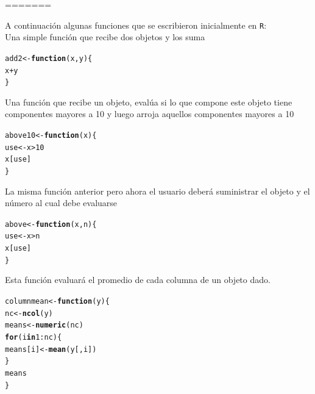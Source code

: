 \documentclass{article}\usepackage[]{graphicx}\usepackage[]{color}
\makeatletter
\newcommand{\hlnum}[1]{\textcolor[rgb]{0.686,0.059,0.569}{#1}}%
\newcommand{\hlopt}[1]{\textcolor[rgb]{0,0,0}{#1}}%
\newcommand{\hlstd}[1]{\textcolor[rgb]{0.345,0.345,0.345}{#1}}%
\newcommand{\hlkwa}[1]{\textcolor[rgb]{0.161,0.373,0.58}{\textbf{#1}}}%
\newcommand{\hlkwb}[1]{\textcolor[rgb]{0.69,0.353,0.396}{#1}}%
\newcommand{\hlkwc}[1]{\textcolor[rgb]{0.333,0.667,0.333}{#1}}%
\newcommand{\hlkwd}[1]{\textcolor[rgb]{0.737,0.353,0.396}{\textbf{#1}}}%
\newenvironment{kframe}{%
 \def\at@end@of@kframe{}%
 \ifinner\ifhmode%
  \def\at@end@of@kframe{\end{minipage}}%
  \begin{minipage}{\columnwidth}%
 \fi\fi%
 \def\FrameCommand##1{\hskip\@totalleftmargin \hskip-\fboxsep
 \colorbox{shadecolor}{##1}\hskip-\fboxsep
     \hskip-\linewidth \hskip-\@totalleftmargin \hskip\columnwidth}%
 \MakeFramed {\advance\hsize-\width
   \@totalleftmargin\z@ \linewidth\hsize
   \@setminipage}}%
 {\par\unskip\endMakeFramed%
 \at@end@of@kframe}
\newenvironment{knitrout}{}{} %
\makeatother
\begin{document}
=======

A continuación algunas funciones que se escribieron inicialmente en \texttt{R}:\\

Una simple función que recibe dos objetos y los suma
\begin{knitrout}
\color{fgcolor}\begin{kframe}
\begin{alltt}
\hlstd{add2} \hlkwb{<-} \hlkwa{function}\hlstd{(}\hlkwc{x}\hlstd{,} \hlkwc{y}\hlstd{) \{}
    \hlstd{x} \hlopt{+} \hlstd{y}
\hlstd{\}}
\end{alltt}
\end{kframe}
\end{knitrout}

Una función que recibe un objeto, evalúa si lo que compone este objeto tiene componentes mayores a 10 y luego arroja aquellos componentes mayores a 10   
\begin{knitrout}
\color{fgcolor}\begin{kframe}
\begin{alltt}
\hlstd{above10} \hlkwb{<-} \hlkwa{function}\hlstd{(}\hlkwc{x}\hlstd{)\{}
      \hlstd{use} \hlkwb{<-} \hlstd{x} \hlopt{>} \hlnum{10}
      \hlstd{x[use]}
\hlstd{\}}
\end{alltt}
\end{kframe}
\end{knitrout}

La misma función anterior pero ahora el usuario deberá suministrar el objeto y el número al cual debe evaluarse
\begin{knitrout}
\color{fgcolor}\begin{kframe}
\begin{alltt}
\hlstd{above} \hlkwb{<-} \hlkwa{function}\hlstd{(}\hlkwc{x}\hlstd{,} \hlkwc{n}\hlstd{)\{}
  \hlstd{use} \hlkwb{<-} \hlstd{x} \hlopt{>} \hlstd{n}
  \hlstd{x[use]}
\hlstd{\}}
\end{alltt}
\end{kframe}
\end{knitrout}

Esta función evaluará el promedio de cada columna de un objeto dado.
\begin{knitrout}
\color{fgcolor}\begin{kframe}
\begin{alltt}
\hlstd{columnmean} \hlkwb{<-} \hlkwa{function}\hlstd{(}\hlkwc{y}\hlstd{) \{}
  \hlstd{nc} \hlkwb{<-} \hlkwd{ncol}\hlstd{(y)}
  \hlstd{means} \hlkwb{<-} \hlkwd{numeric}\hlstd{(nc)}
    \hlkwa{for}\hlstd{(i} \hlkwa{in} \hlnum{1}\hlopt{:}\hlstd{nc) \{}
      \hlstd{means[i]} \hlkwb{<-} \hlkwd{mean}\hlstd{(y[, i])}
    \hlstd{\}}
  \hlstd{means}
\hlstd{\}}
\end{alltt}
\end{kframe}
\end{knitrout}
\end{document}
